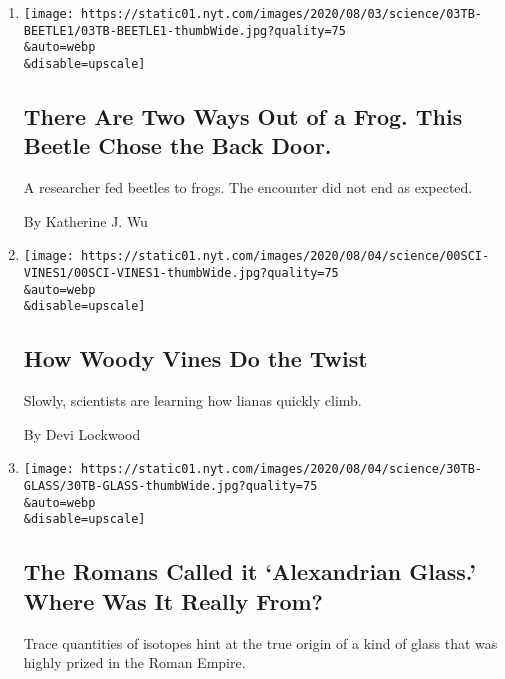 \begin{enumerate}
\def\labelenumi{\arabic{enumi}.}
\item
  \href{/2020/08/03/science/beetle-frog-poop.html}{}

  \texttt{[image: https://static01.nyt.com/images/2020/08/03/science/03TB-BEETLE1/03TB-BEETLE1-thumbWide.jpg?quality=75\\\&auto=webp\\\&disable=upscale]}

  \hypertarget{there-are-two-ways-out-of-a-frog-this-beetle-chose-the-back-door}{%
  \subsection{There Are Two Ways Out of a Frog. This Beetle Chose the
  Back
  Door.}\label{there-are-two-ways-out-of-a-frog-this-beetle-chose-the-back-door}}

  A researcher fed beetles to frogs. The encounter did not end as
  expected.

  By Katherine J. Wu
\item
  \href{/2020/08/01/science/vines-lianas-panama.html}{}

  \texttt{[image: https://static01.nyt.com/images/2020/08/04/science/00SCI-VINES1/00SCI-VINES1-thumbWide.jpg?quality=75\\\&auto=webp\\\&disable=upscale]}

  \hypertarget{how-woody-vines-do-the-twist}{%
  \subsection{How Woody Vines Do the
  Twist}\label{how-woody-vines-do-the-twist}}

  Slowly, scientists are learning how lianas quickly climb.

  By Devi Lockwood
\item
  \href{/2020/07/31/science/alexandrian-glass-rome.html}{}

  \texttt{[image: https://static01.nyt.com/images/2020/08/04/science/30TB-GLASS/30TB-GLASS-thumbWide.jpg?quality=75\\\&auto=webp\\\&disable=upscale]}

  \hypertarget{the-romans-called-it-alexandrian-glass-where-was-it-really-from}{%
  \subsection{The Romans Called it `Alexandrian Glass.' Where Was It
  Really
  From?}\label{the-romans-called-it-alexandrian-glass-where-was-it-really-from}}

  Trace quantities of isotopes hint at the true origin of a kind of
  glass that was highly prized in the Roman Empire.


\end{enumerate}
